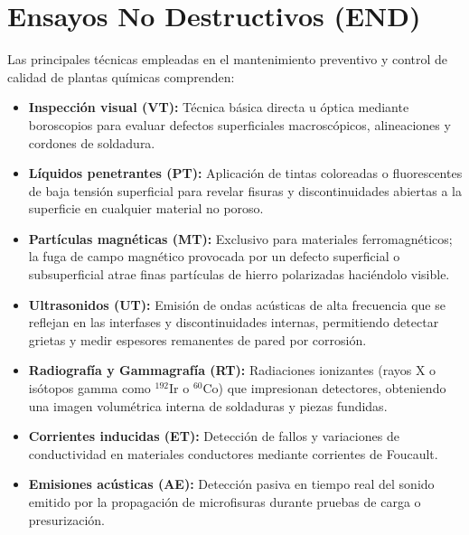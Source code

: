 \section{Ensayos No Destructivos (END)}


Las principales técnicas empleadas en el mantenimiento preventivo y control de calidad de plantas químicas comprenden:
\begin{itemize}
    \item \textbf{Inspección visual (VT):} Técnica básica directa u óptica mediante boroscopios para evaluar defectos superficiales macroscópicos, alineaciones y cordones de soldadura.
    \item \textbf{Líquidos penetrantes (PT):} Aplicación de tintas coloreadas o fluorescentes de baja tensión superficial para revelar fisuras y discontinuidades abiertas a la superficie en cualquier material no poroso.
    \item \textbf{Partículas magnéticas (MT):} Exclusivo para materiales ferromagnéticos; la fuga de campo magnético provocada por un defecto superficial o subsuperficial atrae finas partículas de hierro polarizadas haciéndolo visible.
    \item \textbf{Ultrasonidos (UT):} Emisión de ondas acústicas de alta frecuencia que se reflejan en las interfases y discontinuidades internas, permitiendo detectar grietas y medir espesores remanentes de pared por corrosión.
    \item \textbf{Radiografía y Gammagrafía (RT):} Radiaciones ionizantes (rayos X o isótopos gamma como $^{192}\text{Ir}$ o $^{60}\text{Co}$) que impresionan detectores, obteniendo una imagen volumétrica interna de soldaduras y piezas fundidas.
    \item \textbf{Corrientes inducidas (ET):} Detección de fallos y variaciones de conductividad en materiales conductores mediante corrientes de Foucault.
    \item \textbf{Emisiones acústicas (AE):} Detección pasiva en tiempo real del sonido emitido por la propagación de microfisuras durante pruebas de carga o presurización.
\end{itemize}

